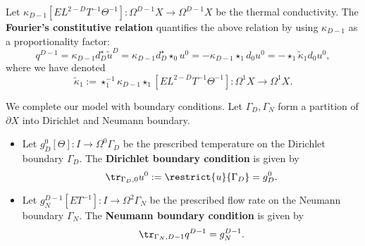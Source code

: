 \begin{discussion}
\begin{itemize}
      Let
      $\kappa_{D - 1} [E L^{2 - D} T^{-1} \Theta^{-1}]
      \colon \Omega^{D - 1} X \to \Omega^{D - 1} X$
      be the thermal conductivity.
      The \textbf{Fourier's constitutive relation}
      quantifies the above relation by using $\kappa_{D - 1}$
      as a proportionality factor:
      \begin{equation}
        q^{D - 1}
        = \kappa_{D - 1} d_D^\star \tilde{u}^D
        = \kappa_{D - 1} d_D^\star \star_0 u^0
        = - \kappa_{D - 1} \star_1 d_0 u^0
        = - \star_1 \tilde{\kappa}_1 d_0 u^0,
      \end{equation}
      where we have denoted
      \begin{equation}
        \tilde{\kappa}_1
        :=\star_1^{-1} \kappa_{D - 1} \star_1 [E L^{2 - D} T^{-1} \Theta^{-1}]
        \colon \Omega^1 X \to \Omega^1 X.
      \end{equation}
  \end{itemize}
  We complete our model with boundary conditions.
  Let $\Gamma_D, \Gamma_N$ form a partition of $\partial X$
  into Dirichlet and Neumann boundary.
  \begin{itemize}
    \item
      Let $g_D^0 [\Theta] \colon I \to \Omega^0 \Gamma_D$
      be the prescribed temperature on the Dirichlet boundary $\Gamma_D$.
      The \textbf{Dirichlet boundary condition} is given by
      \begin{equation}
        \tr_{\Gamma_D, 0} u^0 := \restrict{u}{\Gamma_D} = g_D^0.
      \end{equation}
    \item
      Let $g_N^{D - 1} [E T^{-1}] \colon I \to \Omega^2 \Gamma_N$
      be the prescribed flow rate on the Neumann boundary $\Gamma_N$.
      The \textbf{Neumann boundary condition} is given by
      \begin{equation}
        \tr_{\Gamma_N, D - 1} q^{D - 1} = g_N^{D - 1}.
      \end{equation}
  \end{itemize}
\end{discussion}
